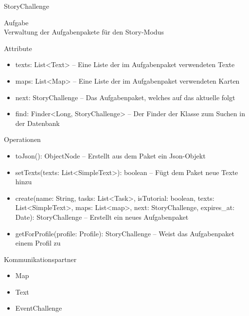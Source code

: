 \newpage
\begin{class}{50}{StoryChallenge}
\item[Aufgabe]~\\
Verwaltung der Aufgabenpakete für den Story-Modus
\item[Attribute]~\\
\begin{itemize}
\item texts: List<Text> -- Eine Liste der im Aufgabenpaket verwendeten Texte
\item maps: List<Map> -- Eine Liste der im Aufgabenpaket verwendeten Karten
\item next: StoryChallenge -- Das Aufgabenpaket, welches auf das aktuelle folgt
\item find: Finder<Long, StoryChallenge> -- Der Finder der Klasse zum Suchen in der Datenbank
\end{itemize}
\item[Operationen]~\\
\begin{itemize}
\item toJson(): ObjectNode -- Erstellt aus dem Paket ein Json-Objekt
\item setTexts(texts: List<SimpleText>): boolean -- Fügt dem Paket neue Texte hinzu
\item create(name: String, tasks: List<Task>, isTutorial: boolean, texts: List<SimpleText>, maps: List<map>, next: StoryChallenge, expires\_at: Date): StoryChallenge -- Erstellt ein neues Aufgabenpaket
\item getForProfile(profile: Profile): StoryChallenge -- Weist das Aufgabenpaket einem Profil zu
\end{itemize}
\item[Kommunikationspartner]~\\
\begin{itemize}
\item Map
\item Text
\item EventChallenge
\end{itemize}
\end{class}

